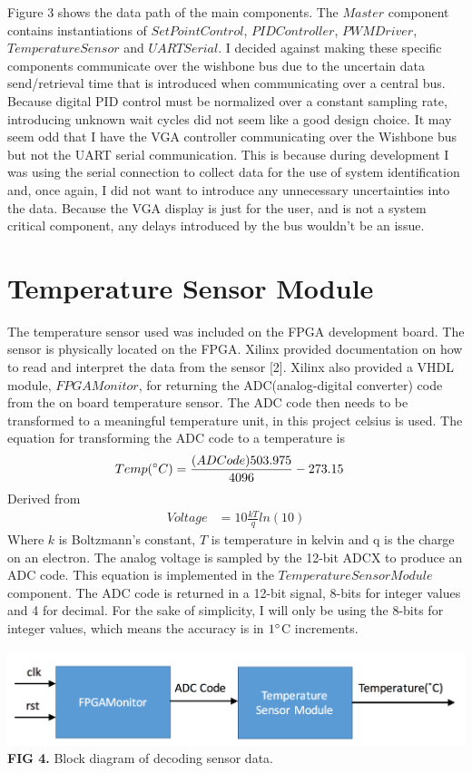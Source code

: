 \documentclass{article}
\begin{document}
Figure 3 shows the data path of the main components. The $Master$ component contains instantiations of $SetPointControl$, $PIDController$, $PWMDriver$, $TemperatureSensor$ and $UARTSerial$. I decided against making these specific components communicate over the wishbone bus due to the uncertain data send/retrieval time that is introduced when communicating over a central bus. Because digital PID control must be normalized over a constant sampling rate, introducing unknown wait cycles did not seem like a good design choice. It may seem odd that I have the VGA controller communicating over the Wishbone bus but not the UART serial communication. This is because during development I was using the serial connection to collect data for the use of system identification and, once again, I did not want to introduce any unnecessary uncertainties into the data. Because the VGA display is just for the user, and is not a system critical component, any delays introduced by the bus wouldn't be an issue. 

\section{Temperature Sensor Module}
The temperature sensor used was included on the FPGA development board. The sensor is physically located on the FPGA. Xilinx provided documentation on how to read and interpret the data from the sensor [2]. Xilinx also provided a VHDL module, $FPGAMonitor$, for returning the ADC(analog-digital converter) code from the on board temperature sensor. The ADC code then needs to be transformed to a meaningful temperature unit, in this project celsius is used. The equation for transforming the ADC code to a temperature is
\begin{align*}
Temp(\degree C) &= \frac{(ADCode)503.975}{4096}-273.15
\end{align*}
Derived from
\begin{align*}
Voltage &= 10\frac{kT}{q}ln(10)
\end{align*}
Where $k$ is Boltzmann's constant, $T$ is temperature in kelvin and q is the charge on an electron. The analog voltage is sampled by the 12-bit ADCX to produce an ADC code.
 This equation is implemented in the $TemperatureSensorModule$ component. The ADC code is returned in a 12-bit signal, 8-bits for integer values and 4 for decimal. For the sake of simplicity, I will only be using the 8-bits for integer values, which means the accuracy is in $1 \degree$C increments.
\begin{center}
\includegraphics[scale=.4]{images/sensorM}\\
\textbf{FIG 4.} Block diagram of decoding sensor data.\\
\end{center}
\end{document}
